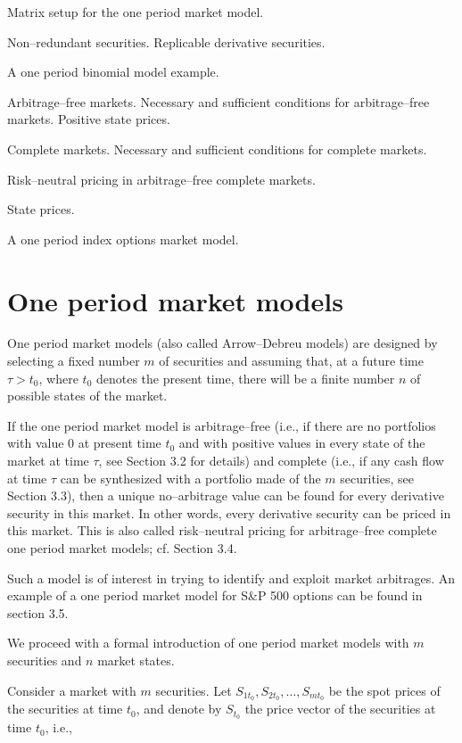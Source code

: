 
\noindent Matrix setup for the one period market model.
\medskip

\noindent Non--redundant securities. Replicable derivative securities.
\medskip

\noindent A one period binomial model example.
\medskip

\noindent Arbitrage--free markets. Necessary and sufficient conditions for
arbitrage--free markets. Positive state prices.
\medskip

\noindent Complete markets. Necessary and sufficient conditions for
complete markets.
\medskip

\noindent Risk--neutral pricing in arbitrage--free complete markets.
\medskip

\noindent State prices.
\medskip

\noindent A one period index options market model.
\medskip

\section{One period market models}

One period market models (also called Arrow--Debreu models) are designed by
selecting a fixed number $m$ of securities and assuming that, at a future
time $\tau > t_0$, where $t_0$ denotes the present time, there will be a
finite number $n$ of possible states of the market.

If the one period market model is arbitrage--free (i.e., if there are no
portfolios with value 0 at present time $t_0$ and with positive values in
every state of the market at time $\tau$, see Section 3.2 for details) and
complete (i.e., if any cash flow at time $\tau$ can be synthesized with a
portfolio made of the $m$ securities, see Section 3.3), then a unique
no--arbitrage value can be found for every derivative security in this
market. In other words, every derivative security can be priced in this
market. This is also called risk--neutral pricing for arbitrage--free
complete one period market models; cf. Section 3.4.

Such a model is of interest in trying to identify and exploit market
arbitrages. An example of a one period market model for S\&P 500 options
can be found in section 3.5.

We proceed with a formal introduction of one period market models with $m$
securities and $n$ market states.

Consider a market with $m$ securities. Let $S_{1t_0}, S_{2t_0}, \ldots,
S_{mt_0}$ be the spot prices of the securities at time $t_0$, and denote by
$S_{t_0}$ the price vector of the securities at time $t_0$, i.e.,

